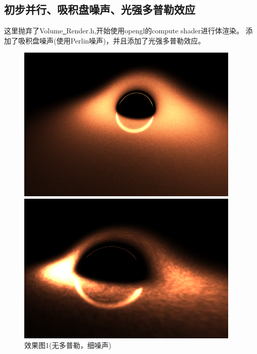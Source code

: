 \documentclass[a4paper, 12pt]{article}
\begin{document}
    \subsection{初步并行、吸积盘噪声、光强多普勒效应}
    这里抛弃了Volume\underline \ Render.h,开始使用opengl的compute shader进行体渲染。
    添加了吸积盘噪声(使用Perlin噪声)，并且添加了光强多普勒效应。
    \begin{figure}[H]
        \centering
        \begin{minipage}[t]{0.48\textwidth}
            \centering
            \includegraphics[width=0.95\textwidth]{photo/perlin2.png}
            \caption{效果图1(无多普勒，细噪声)}
        \end{minipage}
        \hfill
        \begin{minipage}[t]{0.48\textwidth}
            \centering
            \includegraphics[width=0.95\textwidth]{photo/perlin0.png}

\end{minipage}
\end{figure}
\end{document}
